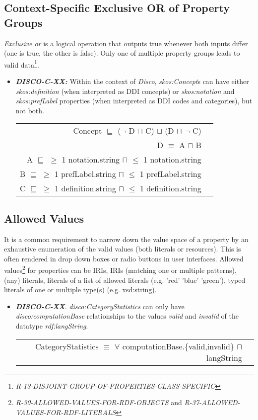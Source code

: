 \documentclass{llncs}
\newenvironment{DL}{
  \vspace{0cm}
  \begin{tabular}{r l}

}{
  \end{tabular}
}
\begin{document}
\subsection{Context-Specific Exclusive OR of Property Groups}

\emph{Exclusive or} is a logical operation that outputs true whenever both inputs differ (one is true, the other is false).
Only one of multiple property groups leads to valid data\footnote{{\em R-13-DISJOINT-GROUP-OF-PROPERTIES-CLASS-SPECIFIC}}.

\begin{itemize}
	\item \textbf{{\em DISCO-C-XX:}}
Within the context of \emph{Disco}, \emph{skos:Concept}s can have either \emph{skos:definition} (when interpreted as DDI concepts) or \emph{skos:notation} and \emph{skos:prefLabel} properties (when interpreted as DDI codes and categories), but not both.

\begin{DL}
Concept $\sqsubseteq$ ($\neg$ D $\sqcap$ C) $\sqcup$ (D $\sqcap$ $\neg$ C) \\ 
D $\equiv$ A $\sqcap$ B \\
A $\sqsubseteq$ $\geq$ 1 notation.string $\sqcap$ $\leq$ 1 notation.string \\
B $\sqsubseteq$ $\geq$ 1 prefLabel.string $\sqcap$ $\leq$ 1 prefLabel.string \\
C $\sqsubseteq$ $\geq$ 1 definition.string $\sqcap$ $\leq$ 1 definition.string \\
\end{DL}
\end{itemize}

\subsection{Allowed Values}

It is a common requirement to narrow down the value space of a property by an exhaustive enumeration of the valid values (both literals or resources). 
This is often rendered in drop down boxes or radio buttons in user interfaces. 
Allowed values\footnote{{\em R-30-ALLOWED-VALUES-FOR-RDF-OBJECTS} and 
{\em R-37-ALLOWED-VALUES-FOR-RDF-LITERALS}} for properties can be IRIs, IRIs (matching one or multiple patterns), (any) literals, literals of a list of allowed literals (e.g. 'red' 'blue' 'green'), typed literals of one or multiple type(s) (e.g. xsd:string).

\begin{itemize}
	\item \textbf{{\em DISCO-C-XX}}.
{\em disco:CategoryStatistics} can only have {\em disco:computationBase} relationships to the values \emph{valid} and \emph{invalid} of the datatype {\em rdf:langString}.

\begin{DL}
CategoryStatistics $\equiv$ $\forall$ computationBase.\{valid,invalid\} $\sqcap$ langString \\
\end{DL}
\end{itemize}
\end{document}
